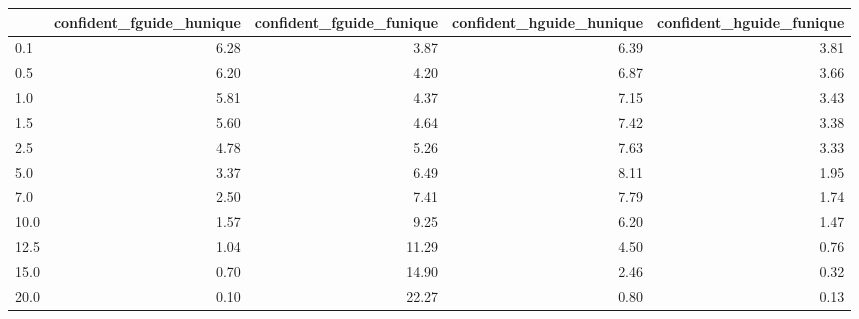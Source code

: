 \begin{tabular}{lrrrr}
\toprule
 & confident_fguide_hunique & confident_fguide_funique & confident_hguide_hunique & confident_hguide_funique \\
\midrule
0.1 & 6.28 & 3.87 & 6.39 & 3.81 \\
0.5 & 6.20 & 4.20 & 6.87 & 3.66 \\
1.0 & 5.81 & 4.37 & 7.15 & 3.43 \\
1.5 & 5.60 & 4.64 & 7.42 & 3.38 \\
2.5 & 4.78 & 5.26 & 7.63 & 3.33 \\
5.0 & 3.37 & 6.49 & 8.11 & 1.95 \\
7.0 & 2.50 & 7.41 & 7.79 & 1.74 \\
10.0 & 1.57 & 9.25 & 6.20 & 1.47 \\
12.5 & 1.04 & 11.29 & 4.50 & 0.76 \\
15.0 & 0.70 & 14.90 & 2.46 & 0.32 \\
20.0 & 0.10 & 22.27 & 0.80 & 0.13 \\
\bottomrule
\end{tabular}
